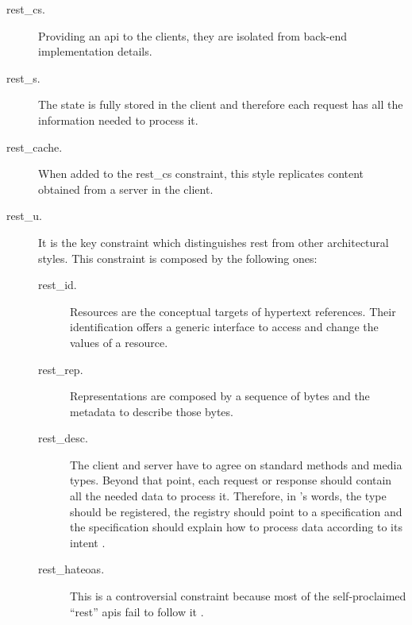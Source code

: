 \begin{description}
 \item[\acf{rest_cs}.] Providing an \ac{api} to the clients, they are isolated from back-end implementation details.
 \item[\acf{rest_s}.] The state is fully stored in the client and therefore each request has all the information needed to process it.
 \item[\acf{rest_cache}.] When added to the \ac{rest_cs} constraint, this style replicates content obtained from a server in the client.
 \item[\acf{rest_u}.] It is the key constraint which distinguishes \ac{rest} from other architectural styles.
                      This constraint is composed by the following ones:
    \begin{description}
	\item[\acf{rest_id}.] Resources are the conceptual targets of hypertext references.
			      Their identification offers a generic interface to access and change the values of a resource.
	\item[\acf{rest_rep}.] Representations are composed by a sequence of bytes and the metadata to describe those bytes.
	\item[\acf{rest_desc}.] The client and server have to agree on standard methods and media types. %
	                        Beyond that point, each request or response should contain all the needed data to process it.
	                        Therefore, in \citeauthor{fielding_architectural_2000}'s words,
	                        the type should be registered,
	                        the registry should point to a specification and 
	                        the specification should explain how to process data according to its intent \citep{wahbe_self-descriptive_2010}. %
	\item[\acf{rest_hateoas}.] This is a controversial constraint because most of the self-proclaimed ``\ac{rest}'' \acp{api} fail to follow it \citep{moore_hypermedia_2010,house_how_2012}.

\end{description}
\end{description}
